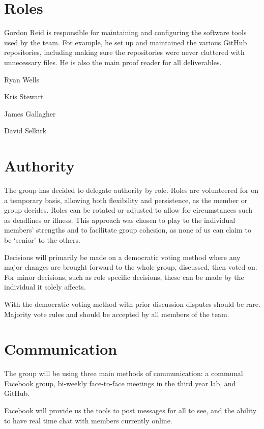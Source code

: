 \documentclass{l3deliverable}
\begin{document}
\pagebreak

\section{Roles}

Gordon Reid is responsible for maintaining and configuring the software tools
used by the team. For example, he set up and maintained the various GitHub
repositories, including making sure the repositories were never cluttered
with unnecessary files. He is also the main proof reader for all
deliverables.

Ryan Wells

Kris Stewart

James Gallagher

David Selkirk

\section{Authority}

The group has decided to delegate authority by role. Roles are volunteered for
on a temporary basis, allowing both flexibility and persistence, as the
member or group decides. Roles can be rotated or adjusted to allow for
circumstances such as deadlines or illness. This approach was chosen to play
to the individual members' strengths and to facilitate group cohesion, as none
of us can claim to be `senior' to the others.

Decisions will primarily be made on a democratic voting method where any
major changes are brought forward to the whole group, discussed, then voted
on. For minor decisions, such as role specific decisions, these can be made
by the individual it solely affects.

With the democratic voting method with prior discussion disputes should be
rare. Majority vote rules and should be accepted by all members of the team.

\section{Communication}
\label{sec:com}

The group will be using three main methods of communication: a communal
Facebook group, bi-weekly face-to-face meetings in the third year lab,
and GitHub.

Facebook will provide us the tools to post messages for all to see, and the
ability to have real time chat with members currently online.
\end{document}
